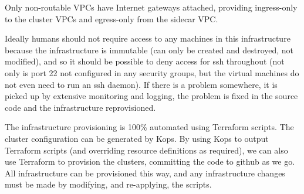 \documentclass[reprint,amsmath,amssymb,aps]{revtex4-1}
\begin{document}
Only non-routable VPCs have Internet gateways attached, providing ingress-only to the cluster VPCs and egress-only from the sidecar VPC.

Ideally humans should not require access to any machines in this infrastructure because the infrastructure is immutable (can only be created and destroyed, not modified), and so it should be possible to deny access for ssh throughout (not only is port 22 not configured in any security groups, but the virtual machines do not even need to run an ssh daemon). If there is a problem somewhere, it is picked up by extensive monitoring and logging, the problem is fixed in the source code and the infrastructure reprovisioned.

The infrastructure provisioning is 100\% automated using Terraform scripts. The cluster configuration can be generated by Kops. By using Kops to output Terraform scripts (and overriding resource definitions as required), we can also use Terraform to provision the clusters, committing the code to github as we go. All infrastructure can be provisioned this way, and any infrastructure changes must be made by modifying, and re-applying, the scripts.


\end{document}
